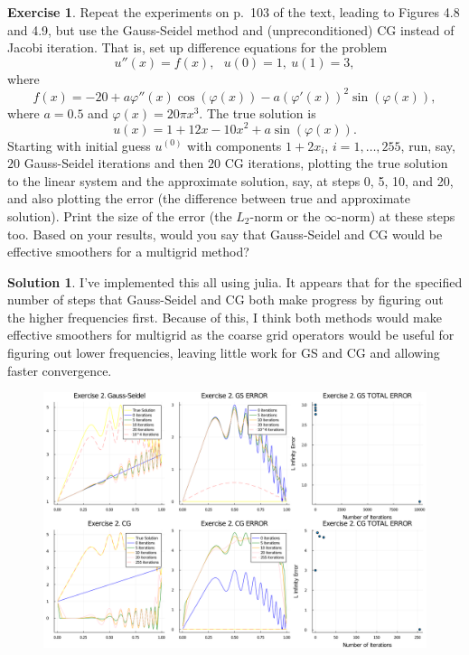\documentclass[12pt]{article}
\renewcommand{\phi}{\varphi}
\theoremstyle{definition}
\newtheorem{exer}{Exercise}
\newtheorem{sol}{Solution}
\theoremstyle{remark}
\begin{document}
\newpage

\begin{exer}
Repeat the experiments on p.~103 of the text, leading to Figures 4.8 and
4.9, but use the Gauss-Seidel method and (unpreconditioned) CG instead of
Jacobi iteration.
That is, set up difference equations for the problem
\[
u''(x) = f(x),~~~u(0) = 1 ,~u(1) = 3 ,
\]
where
\[
f(x) = -20 + a \phi'' (x) \cos( \phi (x)) - a ( \phi' (x) )^2 \sin ( \phi (x) ),
\]
where $a = 0.5$ and $\phi (x) = 20 \pi x^3$.  The true solution is
\[
u(x) = 1 + 12 x - 10 x^2 + a \sin ( \phi (x) ) .
\]
Starting with initial guess $u^{(0)}$ with components $1 + 2 x_i$,
$i=1, \ldots , 255$, run, say, $20$ Gauss-Seidel iterations and then
$20$ CG iterations, plotting the true solution to the linear system
and the approximate solution, say, at steps 0, 5, 10, and 20, and
also plotting the error (the difference between true and approximate
solution).  Print the size of the error (the $L_2$-norm or the $\infty$-norm)
at these steps too.  Based on your results, would you say that Gauss-Seidel
and CG would be effective smoothers for a multigrid method?
\end{exer}

\begin{sol}
    I've implemented this all using julia. It appears that for the specified number of steps that Gauss-Seidel and CG both make progress by figuring out the higher frequencies first. Because of this, I think both methods would make effective smoothers for multigrid as the coarse grid operators would be useful for figuring out lower frequencies, leaving little work for GS and CG and allowing faster convergence.

    \begin{figure}[ht]
        \centering
        \includegraphics[width=0.8\linewidth]{figs/hw-6-exer-2-gs-cg.png}
        \caption{}%
        \label{fig:Exercise_2}
    \end{figure}
\end{sol}
\end{document}
